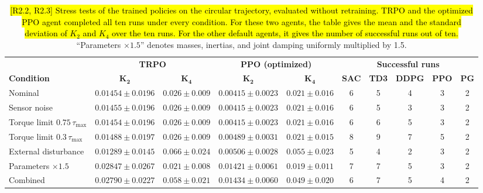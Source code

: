 \documentclass{ieeeaccess}
\newcommand{\hlone}[1]{{\sethlcolor{rone}\hl{#1}}}
\begin{document}
\begin{table}[t]
    \centering
    \caption{\hlone{[R2.2, R2.3] Stress tests of the trained policies on the circular trajectory, evaluated without retraining.
    TRPO and the optimized PPO agent completed all ten runs under every condition. For these two agents, the
    table gives the mean and the standard deviation of $K_2$ and $K_4$ over the ten runs. For the other
    default agents, it gives the number of successful runs out of ten.} ``Parameters
    $\times 1.5$'' denotes masses, inertias, and joint damping uniformly multiplied by 1.5.}
    \label{tab:robustness_eval}
    \renewcommand{\arraystretch}{1.2}
    \setlength{\tabcolsep}{4pt}
    \small
    \begin{tabular}{lccccccccc}
        \toprule
        & \multicolumn{2}{c}{\textbf{TRPO}} & \multicolumn{2}{c}{\textbf{PPO (optimized)}} &
          \multicolumn{5}{c}{\textbf{Successful runs}} \\
        \cmidrule(lr){2-3} \cmidrule(lr){4-5} \cmidrule(lr){6-10}
        \textbf{Condition} & $\boldsymbol{K_2}$ & $\boldsymbol{K_4}$ & $\boldsymbol{K_2}$ & $\boldsymbol{K_4}$ &
          \textbf{SAC} & \textbf{TD3} & \textbf{DDPG} & \textbf{PPO} & \textbf{PG} \\
        \midrule
        Nominal & $0.01454 \pm 0.0196$ & $0.026 \pm 0.009$ & $0.00415 \pm 0.0023$ & $0.021 \pm 0.016$ &
          6 & 5 & 4 & 3 & 2 \\
        Sensor noise & $0.01455 \pm 0.0196$ & $0.026 \pm 0.009$ & $0.00415 \pm 0.0023$ & $0.021 \pm 0.016$ &
          6 & 5 & 3 & 3 & 2 \\
        Torque limit $0.75\,\tau_{\max}$ & $0.01454 \pm 0.0196$ & $0.026 \pm 0.009$ & $0.00415 \pm 0.0023$ &
          $0.021 \pm 0.016$ & 6 & 6 & 5 & 3 & 2 \\
        Torque limit $0.3\,\tau_{\max}$ & $0.01488 \pm 0.0197$ & $0.026 \pm 0.009$ & $0.00489 \pm 0.0031$ &
          $0.021 \pm 0.015$ & 8 & 9 & 7 & 5 & 2 \\
        External disturbance & $0.01289 \pm 0.0145$ & $0.066 \pm 0.024$ & $0.00506 \pm 0.0028$ &
          $0.055 \pm 0.023$ & 5 & 4 & 2 & 3 & 2 \\
        Parameters $\times 1.5$ & $0.02847 \pm 0.0267$ & $0.021 \pm 0.008$ & $0.01421 \pm 0.0061$ &
          $0.019 \pm 0.011$ & 7 & 7 & 5 & 3 & 2 \\
        Combined & $0.02790 \pm 0.0227$ & $0.058 \pm 0.021$ & $0.01434 \pm 0.0060$ & $0.049 \pm 0.020$ &
          6 & 7 & 5 & 4 & 2 \\
        \bottomrule
    \end{tabular}
\end{table}
\end{document}
